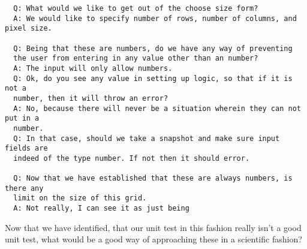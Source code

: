 \begin{verbatim}
  Q: What would we like to get out of the choose size form?
  A: We would like to specify number of rows, number of columns, and pixel size.

  Q: Being that these are numbers, do we have any way of preventing
  the user from entering in any value other than an number?
  A: The input will only allow numbers.
  Q: Ok, do you see any value in setting up logic, so that if it is not a
  number, then it will throw an error?
  A: No, because there will never be a situation wherein they can not put in a
  number.
  Q: In that case, should we take a snapshot and make sure input fields are
  indeed of the type number. If not then it should error.

  Q: Now that we have established that these are always numbers, is there any 
  limit on the size of this grid.
  A: Not really, I can see it as just being
\end{verbatim}


Now that we have identified, that our unit test in this fashion really isn't a
good unit test, what would be a good way of approaching these in a scientific
fashion?
